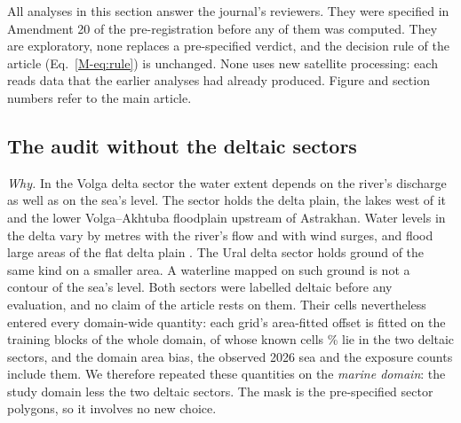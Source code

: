 
All analyses in this section answer the journal's reviewers. They were specified in Amendment 20 of the pre-registration before any of them was computed. They are exploratory, none replaces a pre-specified verdict, and the decision rule of the article (Eq.~\ref{M-eq:rule}) is unchanged. None uses new satellite processing: each reads data that the earlier analyses had already produced. Figure and section numbers refer to the main article.

\subsection*{The audit without the deltaic sectors}
\emph{Why.} In the Volga delta sector the water extent depends on the river's discharge as well as on the sea's level. The sector holds the delta plain, the lakes west of it and the lower Volga--Akhtuba floodplain upstream of Astrakhan. Water levels in the delta vary by metres with the river's flow and with wind surges, and flood large areas of the flat delta plain \citep{yaitskaya2023}. The Ural delta sector holds ground of the same kind on a smaller area. A waterline mapped on such ground is not a contour of the sea's level. Both sectors were labelled deltaic before any evaluation, and no claim of the article rests on them. Their cells nevertheless entered every domain-wide quantity: each grid's area-fitted offset is fitted on the training blocks of the whole domain, of whose known cells \% lie in the two deltaic sectors, and the domain area bias, the observed 2026 sea and the exposure counts include them. We therefore repeated these quantities on the \emph{marine domain}: the study domain less the two deltaic sectors. The mask is the pre-specified sector polygons, so it involves no new choice.

